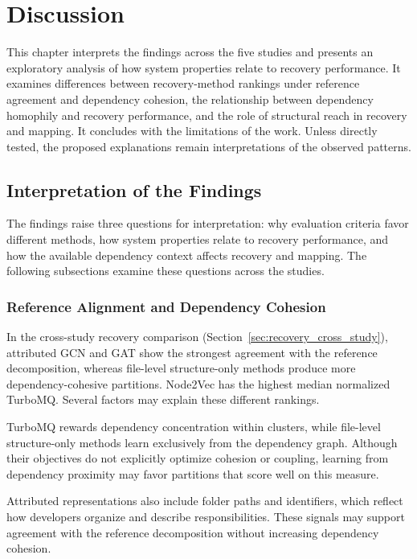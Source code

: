  \chapter{Discussion \label{ch:discussion}}
 \chaptertoc

This chapter interprets the findings across the five studies and presents an exploratory analysis of how system properties relate to recovery performance. It examines differences between recovery-method rankings under reference agreement and dependency cohesion, the relationship between dependency homophily and recovery performance, and the role of structural reach in recovery and mapping. It concludes with the limitations of the work. Unless directly tested, the proposed explanations remain interpretations of the observed patterns.

\section{Interpretation of the Findings}

The findings raise three questions for interpretation: why evaluation criteria favor different methods, how system properties relate to recovery performance, and how the available dependency context affects recovery and mapping. The following subsections examine these questions across the studies.

\subsection{Reference Alignment and Dependency Cohesion}

In the cross-study recovery comparison (Section~\ref{sec:recovery_cross_study}), attributed GCN and GAT show the strongest agreement with the reference decomposition, whereas file-level structure-only methods produce more dependency-cohesive partitions. Node2Vec has the highest median normalized TurboMQ. Several factors may explain these different rankings.

TurboMQ rewards dependency concentration within clusters, while file-level structure-only methods learn exclusively from the dependency graph. Although their objectives do not explicitly optimize cohesion or coupling, learning from dependency proximity may favor partitions that score well on this measure.

Attributed representations also include folder paths and identifiers, which reflect how developers organize and describe responsibilities. These signals may support agreement with the reference decomposition without increasing dependency cohesion.

